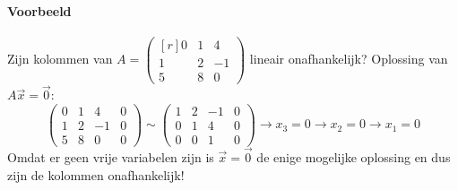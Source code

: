 \paragraph{Voorbeeld} Zijn kolommen van $A = \begin{pmatrix*}[r]
	0 & 1 & 4 \\
	1 & 2 & -1 \\
	5 & 8 & 0
\end{pmatrix*}$ lineair onafhankelijk?
Oplossing van $A \vec{x} = \vec{0}$:
\[ \left(\!\begin{array}{rrr|r}
	0 & 1 & 4 & 0 \\
	1 & 2 & -1 & 0 \\
	5 & 8 & 0 & 0
\end{array}\!\right) \sim \left(\!\begin{array}{rrr|r}
	1 & 2 & -1 & 0 \\
	0 & 1 & 4 & 0 \\
	0 & 0 & 1 & 0
\end{array} \!\right) \to x_3 = 0 \to x_2 = 0 \to x_1 = 0 \]
Omdat er geen vrije variabelen zijn is $\vec{x} = \vec{0}$ de enige mogelijke oplossing en dus zijn de kolommen onafhankelijk!

